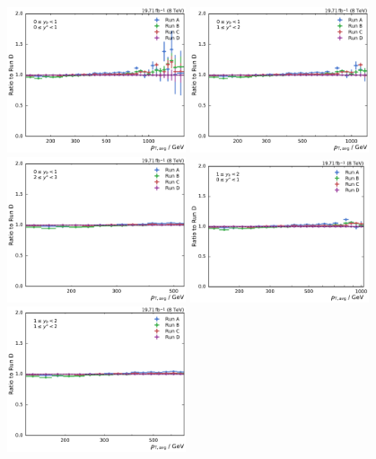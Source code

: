 \begin{figure}[htbp]
    \centering
    \includegraphics[width=0.47\textwidth]{figures/measurement/run_comparison_yb0ys0.pdf}\hfill
    \includegraphics[width=0.47\textwidth]{figures/measurement/run_comparison_yb0ys1.pdf}
    \includegraphics[width=0.47\textwidth]{figures/measurement/run_comparison_yb0ys2.pdf}\hfill
    \includegraphics[width=0.47\textwidth]{figures/measurement/run_comparison_yb1ys0.pdf}
    \includegraphics[width=0.47\textwidth]{figures/measurement/run_comparison_yb1ys1.pdf}\hfill

\end{figure}
